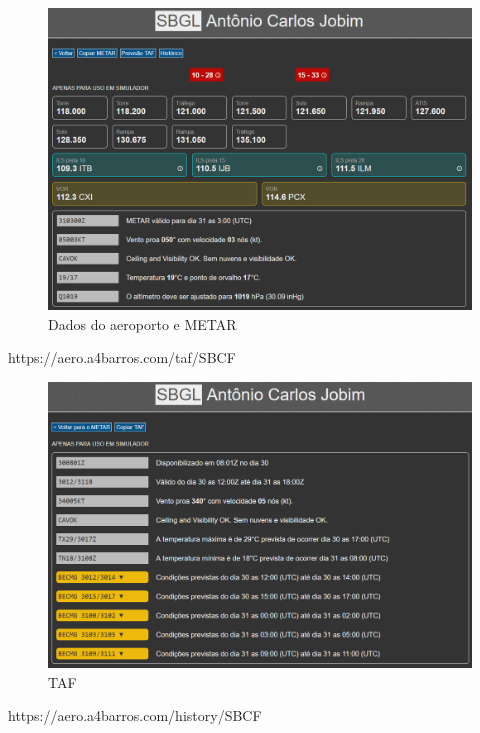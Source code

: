 \begin{figure}[H]
    \begin{center}
    \includegraphics[width=\linewidth]{img/img-metar.png}
    \caption{Dados do aeroporto e METAR}
    \label{fig:img-metar.png}
    \end{center}
\end{figure}

https://aero.a4barros.com/taf/SBCF

\begin{figure}[H]
    \begin{center}
    \includegraphics[width=\linewidth]{img/img-taf.png}
    \caption{TAF}
    \label{fig:img-taf.png}
    \end{center}
\end{figure}

https://aero.a4barros.com/history/SBCF

